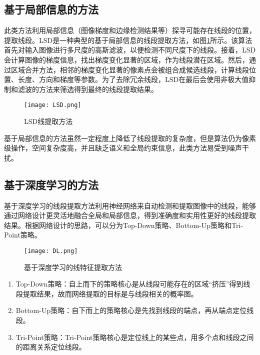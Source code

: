 \subsection{基于局部信息的方法}
此类方法利用局部信息（图像梯度和边缘检测结果等）探寻可能存在线段的位置，提取线段。LSD\cite{von2008lsd}是一种典型的基于局部信息的线段提取方法，如图\ref{fig_LSD}所示。该算法首先对输入图像进行多尺度的高斯滤波，以便检测不同尺度下的线段。接着，LSD会计算图像的梯度信息，找出梯度变化显著的区域，作为线段潜在区域。然后，通过区域合并方法，相邻的梯度变化显著的像素点会被组合成候选线段，计算线段位置、长度、方向和梯度等参数。为了去除冗余线段，LSD在最后会使用非极大值抑制和滤波的方法来筛选得到最终的线段提取结果。
\begin{figure}
  \centering
  \texttt{[image: LSD.png]}
  \caption{LSD线提取方法}
  \label{fig_LSD}
\end{figure}
基于局部信息的方法虽然一定程度上降低了线段提取的复杂度，但是算法仍为像素级操作，空间复杂度高，并且缺乏语义和全局约束信息，此类方法易受到噪声干扰。

\subsection{基于深度学习的方法}
基于深度学习的线段提取方法利用神经网络来自动检测和提取图像中的线段，能够通过网络设计更灵活地融合全局和局部信息，得到准确度和实用性更好的线段提取结果。根据网络设计的思路，可以分为Top-Down策略、Bottom-Up策略和Tri-Point策略。
\begin{figure}
  \centering
  \texttt{[image: DL.png]}
  \caption{基于深度学习的线特征提取方法}
  \label{fig_DL}
\end{figure}
\begin{enumerate}
  \item Top-Down策略：自上而下的策略核心是从线段可能存在的区域“挤压”得到线段提取结果，故而网络提取的目标是与线段相关的概率图。
  \item Bottom-Up策略：自下而上的策略核心是先找到线段的端点，再从端点定位线段。
  \item Tri-Point策略：Tri-Point策略核心是定位线上的某些点，用多个点和线段之间的距离关系定位线段。
\end{enumerate}

